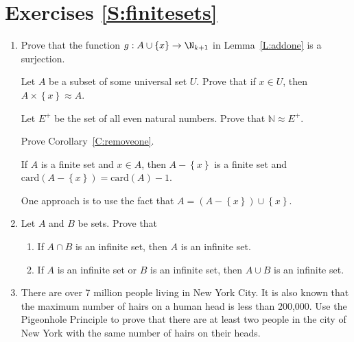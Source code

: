 \section*{Exercises \ref{S:finitesets}}

\begin{enumerate}
\item Prove that the function $g: A \cup \left\{ x \right\} \to \N_{k+1}$ in 
Lemma~\ref{L:addone} is a surjection. 
\label{exer:addonesurjection}%

\xitem Let $A$ be a subset of some universal set $U$.  Prove that if $x \in U$\!, then 
\linebreak $A \times \left\{ x \right\} \approx A$. 
\label{exer:sec92-1}%

\xitem Let $E^+$ be the set of all even natural numbers.  Prove that $\mathbb{N} \approx E^+$. \label{exer91:evennaturals}

\xitem  Prove Corollary~\ref{C:removeone}. 
\label{exer:sec92corollary}%

If $A$ is a finite set and $x \in A$, then $A - \left\{ x \right\}$ is a finite set and  \\
$\text{card} ( A - \left\{ x \right\} ) = \text{card} ( A ) - 1$.

\hint  One approach is to use the fact that $A = \left( A - \left\{ x \right\} \right) \cup \left\{x \right\}$.

\item Let $A$ and $B$ be sets.  Prove that 
\label{exer:sec92-finitesets}%
\begin{enumerate}
\yitem If $A$ is a finite set, then $A \cap B$ is a finite set.

\yitem If $A \cup B$ is a finite set, then $A$ and $B$ are finite sets.

\item If $A \cap B$ is an infinite set, then $A$ is an infinite set.

\item If $A$ is an infinite set or $B$ is an infinite set, then $A \cup B$ is an infinite set.
\end{enumerate}

\item There are over 7 million people living in New York City.  It is also known that the maximum number of hairs on a human head is less than 200,000.  Use the Pigeonhole Principle to prove that there are at least two people in the city of New York with the same number of hairs on their heads. 
\label{exer:sec92-pigeon}%



\end{enumerate}
